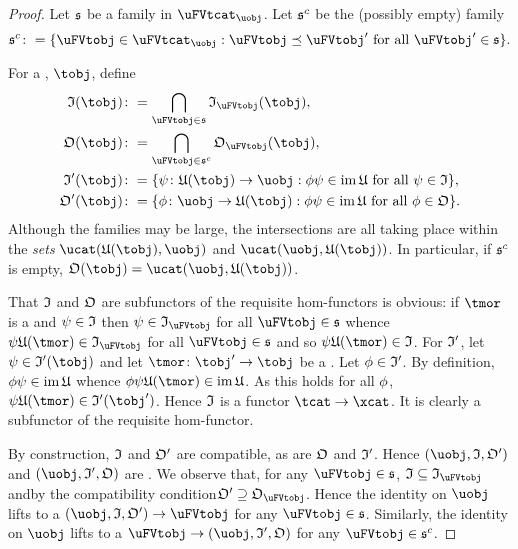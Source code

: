 \documentclass[%
12pt,%
arxiv,%
defaults
]{myclass}
\begin{document}
\begin{proof}
Let \(\family{S}\) be a family in \(\uFVtcat_{\uobj}\).
Let \(\family{S}^c\) be the (possibly empty) family
%
\[
  \family{S}^c \coloneqq \{\uFVtobj \in \uFVtcat_{\uobj} : \uFVtobj \preceq \uFVtobj' \text{ for all } \uFVtobj' \in \family{S}\}.
\]

For a \tobj, \(\tobj\), define
%
\begin{align*}
\itest(\tobj) &\coloneqq \bigcap_{\uFVtobj \in \family{S}} \itest_{\uFVtobj}(\tobj), \\
%
\otest(\tobj) &\coloneqq \bigcap_{\uFVtobj \in \family{S}^c} \otest_{\uFVtobj}(\tobj), \\
%
\itest'(\tobj) &\coloneqq \{ \ifn \colon \ufunc(\tobj) \to \uobj : \ofn \ifn \in \im \ufunc \text{ for all } \ifn \in \itest\}, \\
%
\otest'(\tobj) &\coloneqq \{ \ofn \colon \uobj \to \ufunc(\tobj) : \ofn \ifn \in \im \ufunc \text{ for all } \ofn \in \otest\}.
\end{align*}
%
Although the families may be large, the intersections are all taking place within the \emph{sets} \(\Hom{\ucat}{\ufunc(\tobj)}{\uobj}\) and \(\Hom{\ucat}{\uobj}{\ufunc(\tobj)}\).
In particular, if \(\family{S}^c\) is empty, \(\otest(\tobj) = \Hom{\ucat}{\uobj}{\ufunc(\tobj)}\).

That \(\itest\) and \(\otest\) are subfunctors of the requisite hom\hyp{}functors is obvious: if \(\tmor\) is a \tmor and \(\ifn \in \itest\) then \(\ifn \in \itest_{\uFVtobj}\) for all \(\uFVtobj \in \family{S}\) whence \(\ifn \ufunc(\tmor) \in \itest_{\uFVtobj}\) for all \(\uFVtobj \in \family{S}\) and so \(\ifn \ufunc(\tmor) \in \itest\).
For \(\itest'\), let \(\ifn \in \itest'(\tobj)\) and let \(\tmor \colon \tobj' \to \tobj\) be a \tmor.
Let \(\ofn \in \itest'\).
By definition, \(\ofn \ifn \in \im \ufunc\) whence \(\ofn \ifn \ufunc(\tmor) \in \im \ufunc\).
As this holds for all \(\phi\), \(\ifn \ufunc(\tmor) \in \itest'(\tobj')\).
Hence \(\itest\) is a functor \(\tcat \to \xcat\).
It is clearly a subfunctor of the requisite hom\hyp{}functor.

By construction, \(\itest\) and \(\otest'\) are compatible, as are \(\otest\) and \(\itest'\).
Hence \((\uobj, \itest, \otest')\) and \((\uobj, \itest', \otest)\) are \uVtobjs.
We observe that, for any \(\uFVtobj \in \family{S}\), \(\itest \subseteq \itest_{\uFVtobj}\) and\emhyp{}by the compatibility condition\emhyp{}\(\otest' \supseteq \otest_{\uFVtobj}\).
Hence the identity on \(\uobj\) lifts to a \uVtmor \((\uobj, \itest, \otest') \to \uFVtobj\) for any \(\uFVtobj \in \family{S}\).
Similarly, the identity on \(\uobj\) lifts to a \uVtmor \(\uFVtobj \to (\uobj, \itest', \otest)\) for any \(\uFVtobj \in \family{S}^c\).



\end{proof}
\end{document}

